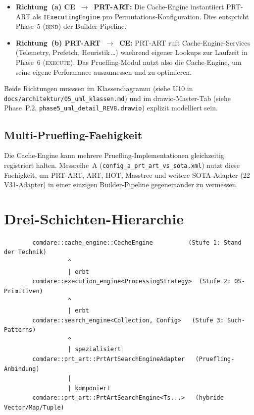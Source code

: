 \begin{itemize}
    \item \textbf{Richtung~(a) CE~$\rightarrow$~PRT-ART:} Die
    Cache-Engine instantiiert PRT-ART als
    \texttt{IExecutingEngine} pro Permutations-Konfiguration.
    Dies entspricht Phase~5 (\textsc{bind}) der
    Builder-Pipeline.

    \item \textbf{Richtung~(b) PRT-ART~$\rightarrow$~CE:} PRT-ART
    ruft Cache-Engine-Services (Telemetry, Prefetch,
    Heuristik\,\dots) waehrend eigener Lookups zur Laufzeit
    in Phase~6 (\textsc{execute}). Das Pruefling-Modul nutzt
    also die Cache-Engine, um seine eigene Performance
    auszumessen und zu optimieren.
\end{itemize}

Beide Richtungen muessen im Klassendiagramm (siehe U10 in
\texttt{docs/architektur/05\_uml\_klassen.md}) und im
drawio-Master-Tab (siehe Phase~P.2,
\texttt{phase5\_uml\_detail\_REV8.drawio}) explizit modelliert sein.

\subsection{Multi-Pruefling-Faehigkeit}

Die Cache-Engine kann mehrere Pruefling-Implementationen
gleichzeitig registriert halten. Messreihe~A
(\texttt{config\_a\_prt\_art\_vs\_sota.xml}) nutzt diese
Faehigkeit, um PRT-ART, ART, HOT, Masstree und weitere
SOTA-Adapter (22 V31-Adapter) in einer einzigen
Builder-Pipeline gegeneinander zu vermessen.

\section{Drei-Schichten-Hierarchie}

\begin{verbatim}
        comdare::cache_engine::CacheEngine          (Stufe 1: Stand der Technik)
                  ^
                  | erbt
        comdare::execution_engine<ProcessingStrategy>  (Stufe 2: OS-Primitiven)
                  ^
                  | erbt
        comdare::search_engine<Collection, Config>   (Stufe 3: Such-Patterns)
                  ^
                  | spezialisiert
        comdare::prt_art::PrtArtSearchEngineAdapter   (Pruefling-Anbindung)
                  |
                  | komponiert
        comdare::prt_art::PrtArtSearchEngine<Ts...>   (hybride Vector/Map/Tuple)
\end{verbatim}

